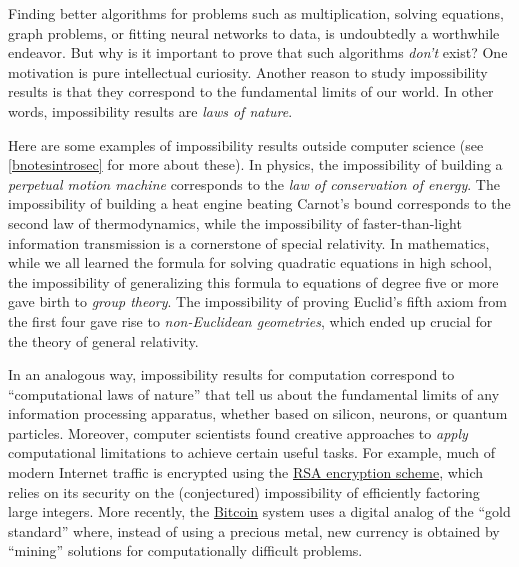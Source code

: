 Finding better algorithms for problems such as multiplication, solving
equations, graph problems, or fitting neural networks to data, is
undoubtedly a worthwhile endeavor. But why is it important to prove that
such algorithms \emph{don't} exist? One motivation is pure intellectual
curiosity. Another reason to study impossibility results is that they
correspond to the fundamental limits of our world. In other words,
impossibility results are \emph{laws of nature}.

Here are some examples of impossibility results outside computer science
(see \cref{bnotesintrosec} for more about these). In physics, the
impossibility of building a \emph{perpetual motion machine} corresponds
to the \emph{law of conservation of energy}. The impossibility of
building a heat engine beating Carnot's bound corresponds to the second
law of thermodynamics, while the impossibility of faster-than-light
information transmission is a cornerstone of special relativity. In
mathematics, while we all learned the formula for solving quadratic
equations in high school, the impossibility of generalizing this formula
to equations of degree five or more gave birth to \emph{group theory}.
The impossibility of proving Euclid's fifth axiom from the first four
gave rise to \emph{non-Euclidean geometries}, which ended up crucial for
the theory of general relativity.

In an analogous way, impossibility results for computation correspond to
``computational laws of nature'' that tell us about the fundamental
limits of any information processing apparatus, whether based on
silicon, neurons, or quantum particles. Moreover, computer scientists
found creative approaches to \emph{apply} computational limitations to
achieve certain useful tasks. For example, much of modern Internet
traffic is encrypted using the
\href{https://en.wikipedia.org/wiki/RSA_(cryptosystem)}{RSA encryption
scheme}, which relies on its security on the (conjectured) impossibility
of efficiently factoring large integers. More recently, the
\href{https://en.wikipedia.org/wiki/Bitcoin}{Bitcoin} system uses a
digital analog of the ``gold standard'' where, instead of using a
precious metal, new currency is obtained by ``mining'' solutions for
computationally difficult problems.

